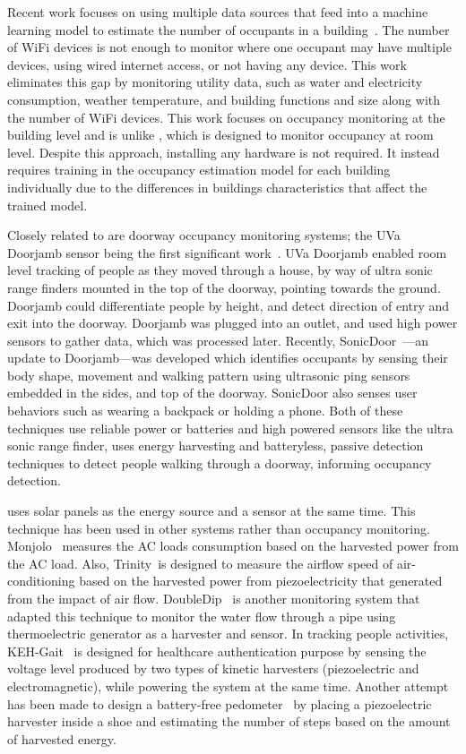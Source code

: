 Recent work focuses on using multiple data sources that feed into a machine learning model to estimate the number of occupants in a building~\cite{das2017non}. The number of WiFi devices is not enough to monitor where one occupant may have multiple devices, using wired internet access, or not having any device. This work eliminates this gap by monitoring utility data, such as water and electricity consumption, weather temperature, and building functions and size along with the number of WiFi devices. This work focuses on occupancy monitoring at the building level and is unlike \sysname, which is designed to monitor occupancy at room level. Despite this approach, installing any hardware is not required. It instead requires training in the occupancy estimation model for each building individually due to the differences in buildings characteristics that affect the trained model.


Closely related to \sysname are doorway occupancy monitoring systems; the UVa Doorjamb sensor being the first significant work~\cite{hnat2012doorjamb}.
UVa Doorjamb enabled room level tracking of people as they moved through a house, by way of ultra sonic range finders mounted in the top of the doorway, pointing towards the ground. Doorjamb could differentiate people by height, and detect direction of entry and exit into the doorway. Doorjamb was plugged into an outlet, and used high power sensors to gather data, which was processed later.
Recently, SonicDoor~\cite{sonicdoor-buildsys2017}---an update to Doorjamb---was developed which identifies occupants by sensing their body shape, movement and walking pattern using ultrasonic ping sensors embedded in the sides, and top of the doorway. SonicDoor also senses user behaviors such as wearing a backpack or holding a phone.
Both of these techniques use reliable power or batteries and high powered sensors like the ultra sonic range finder, \sysname uses energy harvesting and batteryless, passive detection techniques to detect people walking through a doorway, informing occupancy detection.

 \sysname uses solar panels as the energy source and a sensor at the same time. This technique has been used in other systems rather than occupancy monitoring. Monjolo~\cite{debruin2013monjolo} measures the AC loads consumption based on the harvested power from the AC load. Also, Trinity~\cite{xiang2013powering}is designed to measure the airflow speed of air-conditioning based on the harvested power from piezoelectricity that generated from the impact of air flow. DoubleDip~\cite{martin2012doubledip} is another monitoring system that adapted this technique to monitor the water flow through a pipe using thermoelectric generator as a harvester and sensor. In tracking people activities, KEH-Gait~\cite{xu2017keh} is designed for healthcare authentication purpose by sensing the voltage level produced by two types of kinetic harvesters (piezoelectric and electromagnetic), while powering the system at the same time. Another attempt has been made to design a battery-free pedometer~\cite{kalantarian2016pedometers} by placing a piezoelectric harvester inside a shoe and estimating the number of steps based on the amount of harvested energy.

